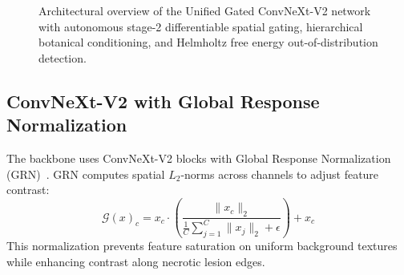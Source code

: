 \documentclass[conference]{IEEEtran}
\begin{document}
\begin{figure}[t]
\centering
{}
\caption{Architectural overview of the Unified Gated ConvNeXt-V2 network with autonomous stage-2 differentiable spatial gating, hierarchical botanical conditioning, and Helmholtz free energy out-of-distribution detection.}
\label{fig:arch-diagram}
\end{figure}

\subsection{ConvNeXt-V2 with Global Response Normalization}
The backbone uses ConvNeXt-V2 blocks with Global Response Normalization (GRN)~\cite{woo2023convnext}. GRN computes spatial $L_2$-norms across channels to adjust feature contrast:
\begin{equation}
\mathcal{G}(x)_c = x_c \cdot \left( \frac{\|x_c\|_2}{\frac{1}{C}\sum_{j=1}^C \|x_j\|_2 + \epsilon} \right) + x_c
\end{equation}
This normalization prevents feature saturation on uniform background textures while enhancing contrast along necrotic lesion edges.
\end{document}
